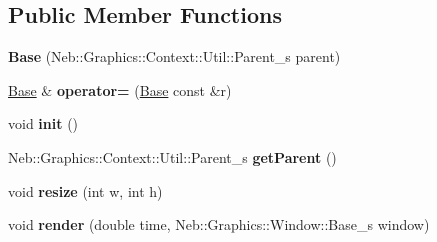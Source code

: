 \subsection*{Public Member Functions}
\begin{DoxyCompactItemize}
\item 
\hypertarget{classNeb_1_1Graphics_1_1Context_1_1Base_aa95ae98cc0e8e6d41ba4b5f6a6b5daa3}{{\bfseries Base} (Neb\-::\-Graphics\-::\-Context\-::\-Util\-::\-Parent\-\_\-s parent)}\label{classNeb_1_1Graphics_1_1Context_1_1Base_aa95ae98cc0e8e6d41ba4b5f6a6b5daa3}

\item 
\hypertarget{classNeb_1_1Graphics_1_1Context_1_1Base_a20e3b1394b65b6612f164afc2203eb62}{\hyperlink{classNeb_1_1Graphics_1_1Context_1_1Base}{Base} \& {\bfseries operator=} (\hyperlink{classNeb_1_1Graphics_1_1Context_1_1Base}{Base} const \&r)}\label{classNeb_1_1Graphics_1_1Context_1_1Base_a20e3b1394b65b6612f164afc2203eb62}

\item 
\hypertarget{classNeb_1_1Graphics_1_1Context_1_1Base_ae53015c10d1b49295bec4b5a232e00fb}{void {\bfseries init} ()}\label{classNeb_1_1Graphics_1_1Context_1_1Base_ae53015c10d1b49295bec4b5a232e00fb}

\item 
\hypertarget{classNeb_1_1Graphics_1_1Context_1_1Base_ac7029fa00d834d315d5a0e80160fd774}{Neb\-::\-Graphics\-::\-Context\-::\-Util\-::\-Parent\-\_\-s {\bfseries get\-Parent} ()}\label{classNeb_1_1Graphics_1_1Context_1_1Base_ac7029fa00d834d315d5a0e80160fd774}

\item 
\hypertarget{classNeb_1_1Graphics_1_1Context_1_1Base_a37f38f6067db83fcb771dba5df582215}{void {\bfseries resize} (int w, int h)}\label{classNeb_1_1Graphics_1_1Context_1_1Base_a37f38f6067db83fcb771dba5df582215}

\item 
\hypertarget{classNeb_1_1Graphics_1_1Context_1_1Base_a969de7cbec52d89e714dcc56fefacce4}{void {\bfseries render} (double time, Neb\-::\-Graphics\-::\-Window\-::\-Base\-\_\-s window)}\label{classNeb_1_1Graphics_1_1Context_1_1Base_a969de7cbec52d89e714dcc56fefacce4}

\end{DoxyCompactItemize}
